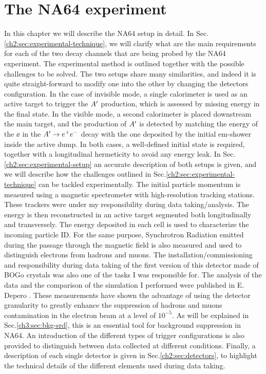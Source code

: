 
\newcommand{\pdirtwo}{chapters/plots/chapter2}

\chapter{The NA64 experiment}

\label{chapter2}


In this chapter we will describe the NA64 setup in detail. In Sec.\ref{ch2:sec:experimental-technique}, we will clarify what are the main requirements for each of the two decay channels that are being probed by the NA64 experiment. The experimental method is outlined together with the possible challenges to be solved. The two setups share many similarities, and indeed it is quite straight-forward to modify one into the other by changing the detectors configuration. In the case of invisible mode, a single calorimeter is used as an active target to trigger the $A'$ production, which is assessed by missing energy in the final state. In the visible mode, a second calorimeter is placed downstream the main target, and the production of $A'$ is detected by matching the energy of the $\ee$ in the $A' \to e^+e^-$ decay with the one deposited by the initial em-shower inside the active dump. In both cases, a well-defined initial state is required, together with a longitudinal hermeticity to avoid any energy leak. In Sec.\ref{ch2:sec:experimental-setup} an accurate description of both setups is given, and we will describe how the challenges outlined in Sec.\ref{ch2:sec:experimental-technique} can be tackled experimentally. The initial particle momentum is measured using a magnetic spectrometer with high-resolution tracking stations. These trackers were under my responsibility during data taking/analysis. The energy is then reconstructed in an active target segmented both longitudinally and transversely. The energy deposited in each cell is used to characterize the incoming particle ID. For the same purpose, Synchrotron Radiation emitted during the passage through the magnetic field is also measured and used to distinguish electrons from hadrons and muons. The installation/commissioning and responsibility during data taking of the first version of this detector made of BOGo crystals was also one of the tasks I was responsible for. The analysis of the data and the comparison of the simulation I performed were published in E. Depero \cite{Depero:2017mrr}. These measurements have shown the advantage of using the detector granularity to greatly enhance the suppression of hadrons and muons contamination in the electron beam at a level of $10^{-5}$. As will be explained in Sec.\ref{ch3:sec:bkg-srd}, this is an essential tool for background suppression in NA64. An introduction of the different types of trigger configurations is also provided to distinguish between data collected at different conditions.
Finally, a description of each single detector is given in Sec.\ref{ch2:sec:detectors}, to highlight  the technical details of the different elements used during data taking. 

